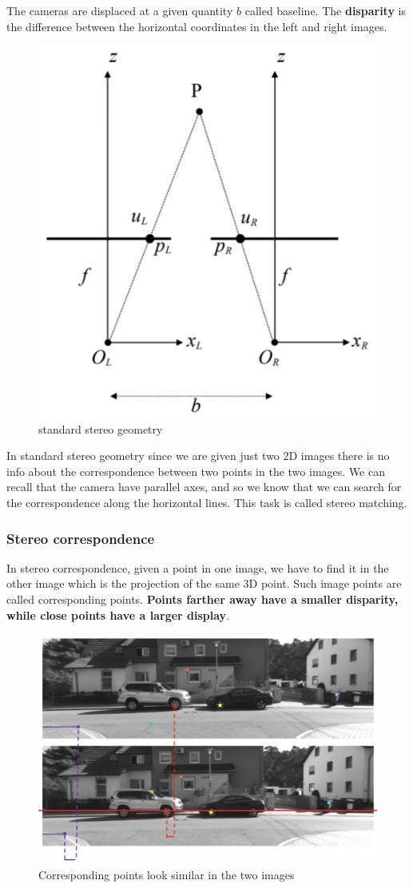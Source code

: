 \documentclass{article}
\begin{document}
The cameras are displaced at a given quantity $b$ called baseline.
The \textbf{disparity} is the difference between the horizontal coordinates in the left and right images.

\begin{figure}[htbp]
  \centering
  \includegraphics[width=0.45\linewidth]{./img/standard_stereo_geometry.jpg}
  \caption{standard stereo geometry}
  \label{fig:standard_stereo_geometry}
\end{figure}


In standard stereo geometry since we are given just two 2D images there is no info about the correspondence between two points in the two images.
We can recall that the camera have parallel axes, and so we know that we can search for the correspondence along the horizontal lines.
This task is called stereo matching.

\subsubsection{Stereo correspondence}
In stereo correspondence, given a point in one image, we have to find it in the other image which is the projection of the same 3D point.
Such image points are called corresponding points.
\textbf{Points farther away have a smaller disparity, while close points have a larger display}.

\begin{figure}[htbp]
  \centering
  \includegraphics[width=0.65\linewidth]{./img/stereo_correspondence.jpg}
  \caption{Corresponding points look similar in the two images}
  \label{fig:stereo_correspondence}
\end{figure}
\end{document}
